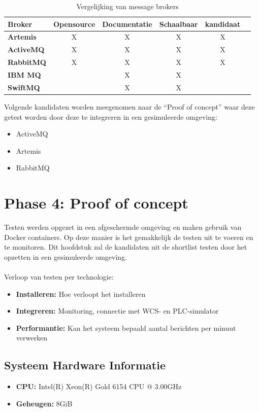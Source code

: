 \begin{table}[h!]
  \centering
  \footnotesize
\begin{tabular}{|l|c|c|c|c|c|}
  \hline
  \textbf{Broker} & \textbf{Opensource} & \textbf{Documentatie} & \textbf{Schaalbaar} & \textbf{kandidaat}\\ \hline
  \textbf{Artemis}   & X & X & X & X \\ \hline
  \textbf{ActiveMQ}  & X & X & X & X \\ \hline
  \textbf{RabbitMQ}  & X & X & X & X \\ \hline  
  \textbf{IBM MQ}    &   & X & X &  \\ \hline 
  \textbf{SwiftMQ}   &   & X & X &  \\ \hline 
\end{tabular}
\caption{Vergelijking van message brokers}
\label{tab:vergelijking_message_brokers_should_have}
\end{table}

Volgende kandidaten worden meegenomen naar de ``Proof of concept'' waar deze getest worden door deze te integreren in een gesimuleerde omgeving:
\begin{itemize}
  \item ActiveMQ
  \item Artemis
  \item RabbitMQ
\end{itemize}
    
\section{Phase 4: Proof of concept}
Testen werden opgezet in een afgeschermde omgeving en maken gebruik van Docker containers.
Op deze manier is het gemakkelijk de testen uit te voeren en te monitoren.
Dit hoofdstuk zal de kandidaten uit de shortlist testen door het opzetten in een gesimuleerde omgeving.
\\\\
Verloop van testen per technologie:
\begin{itemize}
  \item \textbf{Installeren:} Hoe verloopt het installeren
  \item \textbf{Integreren:} Monitoring, connectie met WCS- en PLC-simulator
  \item \textbf{Performantie:} Kan het systeem bepaald aantal berichten per minuut verwerken
\end{itemize}

\subsection{Systeem Hardware Informatie}
\begin{itemize}
    \item \textbf{CPU:} Intel(R) Xeon(R) Gold 6154 CPU @ 3.00GHz
    \item \textbf{Geheugen:} 8GiB
\end{itemize}

